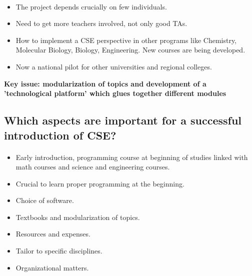 \documentclass[%
twoside,                 %
final,                   %
10pt]{article}
\begin{document}
\paragraph{}

\begin{itemize}
\item The project depends crucially on few individuals. 

\item Need to get more teachers involved, not only good TAs.

\item How  to implement a CSE perspective in other programs like Chemistry, Molecular Biology,  Biology, Engineering. New courses are being developed.

\item Now a national pilot for other universities and regional colleges.
\end{itemize}

\noindent
\textbf{Key issue: modularization of topics and development of a 'technological platform' which glues together different modules}



\subsection{Which aspects are important for a successful introduction of CSE?}

\paragraph{}

\begin{itemize}
\item Early introduction, programming course at beginning of studies linked with math courses and science and engineering courses.

\item Crucial to learn proper programming at the beginning.

\item Choice of software.

\item Textbooks and modularization of topics.

\item Resources and expenses.

\item Tailor to specific disciplines.

\item Organizational matters.
\end{itemize}
\end{document}
